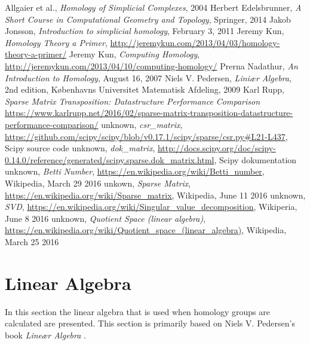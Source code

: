 \documentclass[11pt,a4paper,twoside]{report}
\begin{document}
\begin{thebibliography}{9}

 Allgaier et al., \emph{Homology of Simplicial Complexes}, 2004
Herbert Edelsbrunner, \emph{A Short Course in Computational Geometry and Topology}, Springer, 2014
 Jakob Jonsson, \emph{Introduction to simplicial homology}, February 3, 2011
 Jeremy Kun, \emph{Homology Theory a Primer}, \url{http://jeremykun.com/2013/04/03/homology-theory-a-primer/}
 Jeremy Kun, \emph{Computing Homology}, \url{http://jeremykun.com/2013/04/10/computing-homology/}
 Prerna Nadathur, \emph{An Introduction to Homology}, August 16, 2007
 Niels V. Pedersen, \emph{Liniær Algebra}, 2nd edition, Københavns Universitet Matematisk Afdeling, 2009
 Karl Rupp, \emph{Sparse Matrix Transposition: Datastructure Performance Comparison} \url{https://www.karlrupp.net/2016/02/sparse-matrix-transposition-datastructure-performance-comparison/}
 unknown, \emph{csr\_matrix}, \url{https://github.com/scipy/scipy/blob/v0.17.1/scipy/sparse/csr.py#L21-L437}, Scipy source code
 unknown, \emph{dok\_matrix}, \url{http://docs.scipy.org/doc/scipy-0.14.0/reference/generated/scipy.sparse.dok_matrix.html}, Scipy dokumentation
 unknown, \emph{Betti Number}, \url{https://en.wikipedia.org/wiki/Betti_number}, Wikipedia, March 29 2016
 unkown, \emph{Sparse Matrix}, \url{https://en.wikipedia.org/wiki/Sparse_matrix}, Wikipedia, June 11 2016
 unknown, \emph{SVD}, \url{https://en.wikipedia.org/wiki/Singular_value_decomposition}, Wikiperia, June 8 2016
 unknown, \emph{Quotient Space (linear algebra)}, \url{https://en.wikipedia.org/wiki/Quotient_space_(linear_algebra)}, Wikipedia, March 25 2016
\end{thebibliography}

\appendix
\chapter{Linear Algebra}\label{ch:linalg}
In this section the linear algebra that is used when homology groups are calculated are presented. This section is primarily based on Niels V. Pedersen's book \emph{Lineær Algebra} \cite{LinAlg}.
\end{document}
